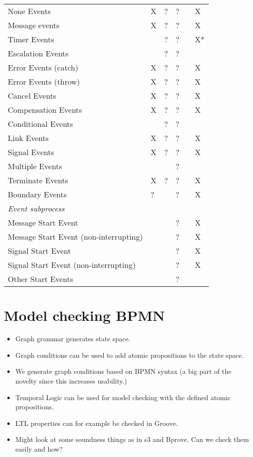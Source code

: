 \documentclass[adraft, copyright, creativecommons]{eptcs} %
\begin{document}
\begin{table}[h]
\begin{tabular}{l l l l l l}
      None Events & X & ? & ? &  & X\\
      Message events & X & ? & ? &  & X\\
      Timer Events &  & ? & ? &  & X*\\
      Escalation Events & & ? & ? &  & \\
      Error Events (catch) & X & ? & ? &  & \color{yellow}X\\ %
      Error Events (throw) & X & ? & ? &  & \color{yellow}X\\
      Cancel Events & X & ? & ? &  & \color{yellow}X\\
      Compensation Events & X & ? & ? &  & \color{yellow}X\\
      Conditional Events &  & ? & ? &  & \\
      Link Events & X & ? & ? &  & X\\
      Signal Events & X & ? & ? &  & X\\
      Multiple Events &  & & ? &  & \\
      Terminate Events & X & ? & ? &  & X\\
     Boundary Events & ? & & ? &  & X\\ %
      \textit{Event subprocess} &  &  &  &  & \\
      Message Start Event &  & & ? &  & X\\
      Message Start Event (non-interrupting) & & & ? &  & X\\
      Signal Start Event &  & & ? &  & X\\
      Signal Start Event (non-interrupting) &  & & ? &  & X\\
      Other Start Events &  & & ? &  & \\ %
    \end{tabular}

\end{table}

\section{Model checking BPMN}
\begin{itemize}
    \item Graph grammar generates state space.
    \item Graph conditions can be used to add atomic propositions to the state space.
    \item We generate graph conditions based on BPMN syntax (a big part of the novelty since this increases usability.)
    \item Temporal Logic can be used for model checking with the defined atomic propositions.
    \item LTL properties can for example be checked in Groove.
    \item Might look at some soundness things as in s3 and Bprove. Can we check them easily and how?
\end{itemize}
\end{document}
